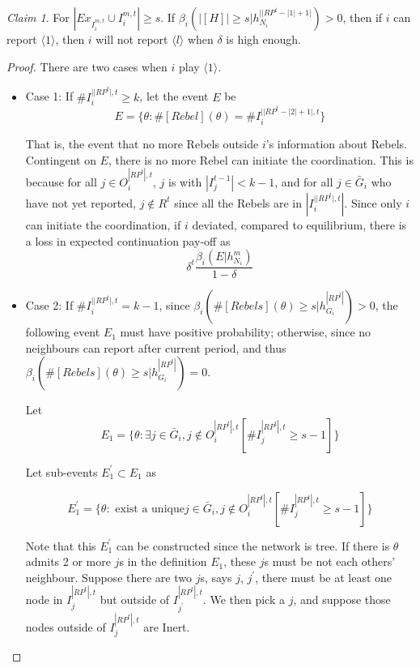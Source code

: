 \documentclass[12pt,letter]{article}
\theoremstyle{definition}
\theoremstyle{remark}
\theoremstyle{claim}
\newtheorem{claim}{Claim}
\begin{document}
\begin{claim}
\label{claim_must_report_1}
For $|Ex_{I^{m,t}_i}\cup I^{m,t}_i|\geq s$. If $\beta_{i}(|[H]|\geq s|h^{||RP^t-|1|+1|}_{N_i})>0$, then if $i$ can report $\langle 1 \rangle$, then $i$ will not report $\langle l \rangle$ when $\delta$ is high enough.
\end{claim}

\begin{proof}

There are two cases when $i$ play $\langle 1 \rangle$.
\begin{itemize}

\item Case 1: If $\#I^{||RP^t|,t}_i\geq k$, let the event $E$ be
\[E=\{\theta: \#[Rebel](\theta)=\# I^{||RP^t-|2|+1|,t}_i\}\]

That is, the event that no more Rebels outside $i$'s information about Rebels. Contingent on $E$, there is no more Rebel can initiate the coordination. This is because for all $j\in O^{|RP^t|,t}_i$, $j$ is with $|I^{t-1}_j|< k-1$, and for all $j\in \bar{G}_i$ who have not yet reported, $j\not\in R^t$ since all the Rebels are in $|I^{||RP^t|,t}_i|$. Since only $i$ can initiate the coordination, if $i$ deviated, compared to equilibrium, there is a loss in expected continuation pay-off as
\[\delta^{t}\frac{\beta_{i}(E|h^{m}_{N_i})}{1-\delta}\]

\item Case 2: If $\#I^{||RP^t|,t}_i= k-1$, since $\beta_{i}(\#[Rebels](\theta)\geq s|h^{|RP^t|}_{G_i})>0$, the following event $E_1$ must have positive probability; otherwise, since no neighbours can report after current period, and thus $\beta_{i}(\#[Rebels](\theta)\geq s|h^{|RP^t|}_{G_i})=0$.

Let
\[E_1=\{\theta: \exists j\in \bar{G}_i, j\notin O^{|RP^t|,t}_i [\#I^{|RP^t|,t}_j\geq s-1]\}\]


Let sub-events $E^{'}_1\subset E_1$ as

\[E^{'}_1=\{\theta: \text{ exist a unique} j\in \bar{G}_i, j\notin O^{|RP^t|,t}_i [\#I^{|RP^t|,t}_j\geq s-1]\}\] 

Note that this $E^{'}_1$ can be constructed since the network is tree. If there is $\theta$ admits 2 or more $j$s in the definition $E_1$, these $j$s must be not each others' neighbour. Suppose there are two $j$s, says $j$, $j^{'}$, there must be at least one node in $I^{|RP^t|,t}_j$ but outside of $I^{|RP^t|,t}_{j^{'}}$. We then pick a $j$, and suppose those nodes outside of $I^{|RP^t|,t}_j$ are Inert.


\end{itemize}
\end{proof}
\end{document}
